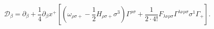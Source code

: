 \begin{equation}
\mathcal{D}_\beta = \partial_\beta + \frac{1}{4} \partial_{\beta} x^+
 \left[  \left(  \omega_{\rho \sigma +} - \frac{1}{2} H_{\rho \sigma +} \sigma^3 \right) 
       \Gamma^{\rho \sigma} + \frac{1}{2 \cdot 4!} F_{\lambda \nu \rho \sigma}
          \Gamma^{\lambda \nu \rho \sigma} \sigma^1 \Gamma_+   \right].
\end{equation}

